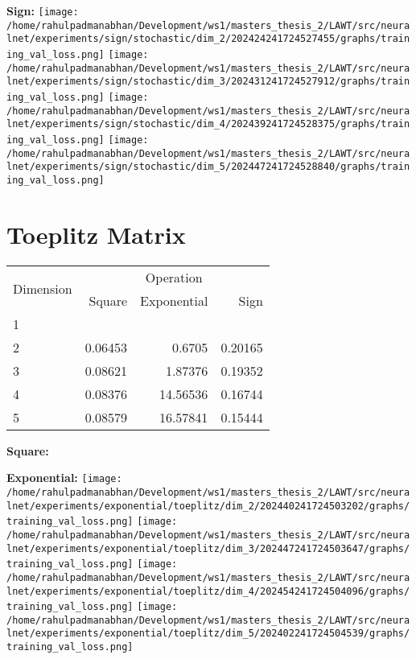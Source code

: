 \documentclass{article}
\begin{document}
\textbf{Sign:}
\texttt{[image: /home/rahulpadmanabhan/Development/ws1/masters\_thesis\_2/LAWT/src/neuralnet/experiments/sign/stochastic/dim\_2/202424241724527455/graphs/training\_val\_loss.png]}
\texttt{[image: /home/rahulpadmanabhan/Development/ws1/masters\_thesis\_2/LAWT/src/neuralnet/experiments/sign/stochastic/dim\_3/202431241724527912/graphs/training\_val\_loss.png]}
\texttt{[image: /home/rahulpadmanabhan/Development/ws1/masters\_thesis\_2/LAWT/src/neuralnet/experiments/sign/stochastic/dim\_4/202439241724528375/graphs/training\_val\_loss.png]}
\texttt{[image: /home/rahulpadmanabhan/Development/ws1/masters\_thesis\_2/LAWT/src/neuralnet/experiments/sign/stochastic/dim\_5/202447241724528840/graphs/training\_val\_loss.png]}


\pagebreak
\section{Toeplitz Matrix}
\begin{tabular}{@{}lrrr@{}}
\toprule
\multirow{2}{*}{Dimension} & \multicolumn{3}{c}{Operation} \\
\cmidrule(l){2-4}
& Square & Exponential & Sign \\
\midrule
1 & & & \\
2 & 0.06453 & 0.6705 & 0.20165 \\
3 & 0.08621 & 1.87376 & 0.19352 \\
4 & 0.08376 & 14.56536 & 0.16744 \\
5 & 0.08579 & 16.57841 & 0.15444 \\
\bottomrule
\end{tabular}

\textbf{Square:}

\textbf{Exponential:}
\texttt{[image: /home/rahulpadmanabhan/Development/ws1/masters\_thesis\_2/LAWT/src/neuralnet/experiments/exponential/toeplitz/dim\_2/202440241724503202/graphs/training\_val\_loss.png]}
\texttt{[image: /home/rahulpadmanabhan/Development/ws1/masters\_thesis\_2/LAWT/src/neuralnet/experiments/exponential/toeplitz/dim\_3/202447241724503647/graphs/training\_val\_loss.png]}
\texttt{[image: /home/rahulpadmanabhan/Development/ws1/masters\_thesis\_2/LAWT/src/neuralnet/experiments/exponential/toeplitz/dim\_4/202454241724504096/graphs/training\_val\_loss.png]}
\texttt{[image: /home/rahulpadmanabhan/Development/ws1/masters\_thesis\_2/LAWT/src/neuralnet/experiments/exponential/toeplitz/dim\_5/202402241724504539/graphs/training\_val\_loss.png]}
\end{document}
